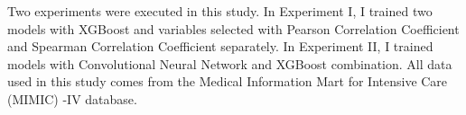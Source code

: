\documentclass[12pt,a4paper,english
]{tunithesis}
\begin{document}


Two experiments were executed in this study. In Experiment I, I trained two models with XGBoost and variables selected with Pearson Correlation Coefficient and Spearman Correlation Coefficient separately. In Experiment II, I trained models with Convolutional Neural Network and XGBoost combination. All data used in this study comes from the Medical Information Mart for Intensive Care (MIMIC) -IV database.
\end{document}
